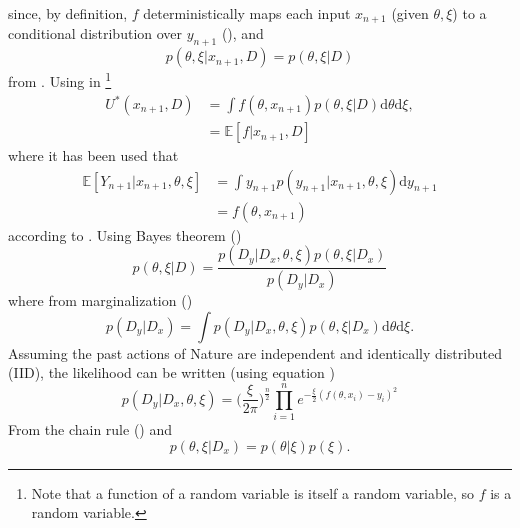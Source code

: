 since, by definition, $f$ deterministically maps each input $x_{n+1}$ (given $\theta,\xi$) to a conditional distribution over $y_{n+1}$ (), and
\begin{equation}
	p(\theta,\xi|x_{n+1},D) = p(\theta,\xi|D)
\end{equation} 
from . Using  in \footnote{Note that a function of a random variable is itself a random variable, so $f$ is a random variable.}
\begin{equation}
	\begin{split}
		U^*(x_{n+1},D) & = \int f(\theta,x_{n+1})  p(\theta,\xi|D) \mathrm{d}\theta \mathrm{d}\xi,\\
		& = \mathbb{E}[f|x_{n+1},D]
	\end{split}
	\label{eq:q3}
\end{equation}	
where it has been used that
\begin{equation}
	\begin{split}
		\mathbb{E}[Y_{n+1}|x_{n+1},\theta,\xi] &= \int y_{n+1} p(y_{n+1}|x_{n+1},\theta,\xi) \mathrm{d}y_{n+1} \\
		&= f(\theta,x_{n+1})
	\end{split}
\end{equation}
according to . Using Bayes theorem ()
\begin{equation}
	p(\theta,\xi|D) = \frac{p(D_y|D_x,\theta,\xi)p(\theta,\xi|D_x)}{p(D_y|D_x)}
	\label{eq:bayes2}
\end{equation}
where from marginalization ()
\begin{equation}
	p(D_y|D_x) = \int p(D_y|D_x,\theta,\xi)p(\theta,\xi|D_x) \mathrm{d}\theta \mathrm{d}\xi.
\end{equation}
Assuming the past actions of Nature are independent and identically distributed (IID), the likelihood can be written (using equation )
\begin{equation}
	p(D_y|D_x,\theta,\xi) = \bigg(\frac{\xi}{2\pi}\bigg)^\frac{n}{2}\prod_{i=1}^n e^{-\frac{\xi}{2}(f(\theta,x_i)-y_i)^2}
	\label{reg:likelihood}
\end{equation}
From the chain rule () and 
\begin{equation}
	p(\theta,\xi|D_x) = p(\theta|\xi)p(\xi).
\end{equation}
